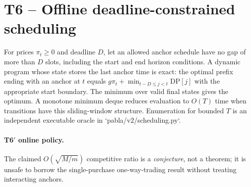 \section*{T6 -- Offline deadline-constrained scheduling}
For prices $\pi_t\ge0$ and deadline $D$, let an allowed anchor schedule
have no gap of more than $D$ slots, including the start and end horizon
conditions. A dynamic program whose state stores the last anchor time
is exact: the optimal prefix ending with an anchor at $t$ equals
$g\pi_t+\min_{t-D\le j<t}\mathrm{DP}[j]$ with the appropriate start
boundary. The minimum over valid final states gives the optimum. A monotone
minimum deque reduces evaluation to $O(T)$ time when transitions have this
sliding-window structure. Enumeration for bounded $T$ is an independent
executable oracle in `pabla/v2/scheduling.py`.
\paragraph{T6$'$ online policy.} The claimed $O(\sqrt{M/m})$ competitive
ratio is a \emph{conjecture}, not a theorem; it is unsafe to borrow the
single-purchase one-way-trading result without treating interacting anchors.
